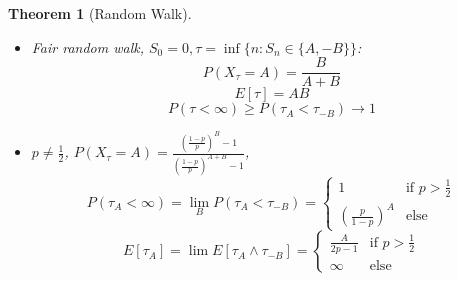 \documentclass{article}
\newtheorem{theorem}{Theorem}
\begin{document}
\begin{theorem}[Random Walk]
  \begin{itemize}
  \item Fair random walk, $S_0 = 0, \tau = \inf\{n: S_n\in \{A, -B\} \}$:
    $$P(X_\tau = A) = \frac{B}{A+B}$$
    $$E[\tau] = AB$$
    $$P(\tau < \infty) \ge P(\tau_A < \tau_{-B}) \rightarrow 1$$

  \item $p \ne \frac12$, $P(X_{\tau} = A) = \frac{(\frac{1-p}p)^B - 1}{(\frac{1-p}p)^{A+B} - 1}$,
    \[
      P(\tau_A < \infty) = \lim_B P(\tau_A < \tau_{-B}) =
      \left\{\begin{array}{cc}1&\text{if } p > \frac12\\(\frac{p}{1-p})^A&\text{else}\end{array}\right.
    \]
    \[
      E[\tau_A] = \lim E[\tau_A \wedge \tau_{-B}] =
      \left\{\begin{array}{cc}\frac{A}{2p-1}&\text{if } p > \frac12\\\infty&\text{else}\end{array}\right.
    \]
  \end{itemize}
\end{theorem}
\end{document}

